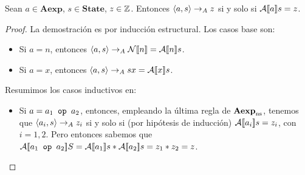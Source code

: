 \begin{prop}
Sean $a \in \mathbf{Aexp}$, $s \in \mathbf{State}$, $z \in \mathbb{Z}$. Entonces $\langle a, s \rangle\rightarrow_A z$ si y solo si $\mathcal{A}[\![a]\!]s =z$.
\end{prop}
\begin{proof}
La demostración es por inducción estructural. Los casos base son:
\begin{itemize}
    \item Si $a = n$, entonces $\langle a, s \rangle\rightarrow_A \mathcal{N}[\![n]\!] = \mathcal{A}[\![n]\!]s$.
    \item Si $a = x$, entonces $\langle a, s \rangle\rightarrow_A sx = \mathcal{A}[\![x]\!]s$.
\end{itemize}
Resumimos los casos inductivos en:
\begin{itemize}
    \item Si $a = a_1 \texttt{ op } a_2$, entonces, empleando la última regla de $\mathbf{Aexp}_{\mathrm{ns}}$, tenemos que $\langle a_i, s \rangle\rightarrow_A z_i$ si y solo si (por hipótesis de inducción) $\mathcal{A}[\![a_i]\!]s = z_i$, con $i = 1, 2$. Pero entonces sabemos que $\mathcal{A}[\![a_1 \texttt{ op }a_2]\!]S = \mathcal{A}[\![a_1]\!]s * \mathcal{A}[\![a_2]\!]s = z_1 * z_2 = z$.
\end{itemize}
\end{proof}

